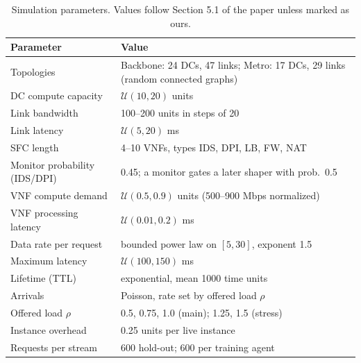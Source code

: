 \documentclass[11pt,a4paper]{article}
\newcommand{\ours}[1]{\textcolor[HTML]{1B7F5A}{#1}}
\begin{document}
\begin{table}[H]
\centering\small
\caption{Simulation parameters. Values follow Section 5.1 of the paper unless
marked as ours.}
\label{tab:params}
\begin{tabularx}{\linewidth}{l X}
\toprule
Parameter & Value \\
\midrule
Topologies & Backbone: 24 DCs, 47 links; Metro: 17 DCs, 29 links (random connected graphs) \\
DC compute capacity & $\mathcal{U}(10, 20)$ units \\
Link bandwidth & 100--200 units in steps of 20 \\
Link latency & $\mathcal{U}(5, 20)$ ms \\
SFC length & 4--10 VNFs, types IDS, DPI, LB, FW, NAT \\
Monitor probability (IDS/DPI) & 0.45; a monitor gates a later shaper with prob.\ 0.5 \\
VNF compute demand & $\mathcal{U}(0.5, 0.9)$ units (500--900 Mbps normalized) \\
VNF processing latency & $\mathcal{U}(0.01, 0.2)$ ms \\
Data rate per request & bounded power law on $[5, 30]$, exponent 1.5 \\
Maximum latency & $\mathcal{U}(100, 150)$ ms \\
Lifetime (TTL) & exponential, mean 1000 time units \\
Arrivals & \ours{Poisson, rate set by offered load $\rho$} \\
Offered load $\rho$ & \ours{0.5, 0.75, 1.0 (main); 1.25, 1.5 (stress)} \\
Instance overhead & \ours{0.25 units per live instance} \\
Requests per stream & \ours{600 hold-out; 600 per training agent} \\
\bottomrule
\end{tabularx}
\end{table}
\end{document}
